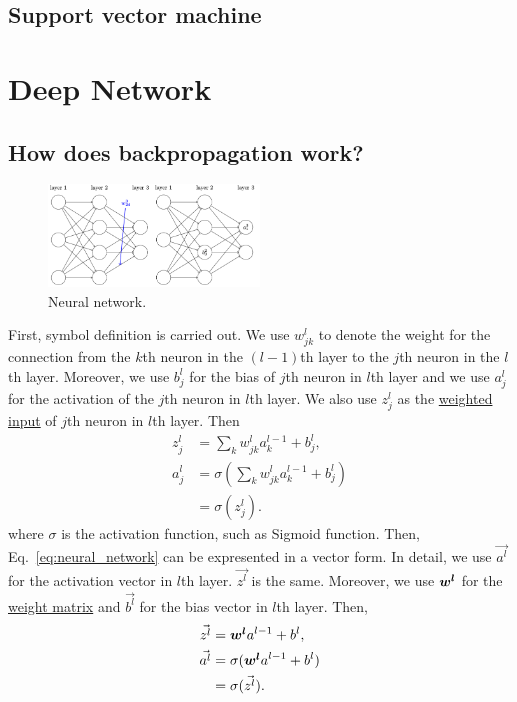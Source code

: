 \documentclass[10pt,onecolumn]{book}
\newcommand{\bm}[1]{\mbox{\boldmath{$#1$}}}
\begin{document}
\section{Support vector machine}


\chapter{Deep Network}
\section{How does backpropagation work?}
\begin{figure}[h]
\centering
\includegraphics[width=0.5\textwidth]{figures/neural_network.png}
\caption{Neural network.}
\end{figure}
First, symbol definition is carried out. We use $w^l_{jk}$ to denote the weight for the connection from the $k$th neuron in the $(l - 1)$th layer to the $j$th neuron in the $l$th layer. Moreover, we use $b^l_j$ for the bias of $j$th neuron in $l$th layer and we use $a^l_j$ for the activation of the $j$th neuron in $l$th layer. We also use $z^l_j$ as the \uline{weighted input}  of $j$th neuron in $l$th layer. Then
\begin{equation}
\begin{split}
z^l_j & = \sum_k w^l_{jk} a^{l - 1} _ k + b^l_j, \\
a^l_j & = \sigma(\sum_k w^l_{jk} a^{l - 1} _ k + b^l_j) \\
	  & = \sigma(z^l_j).
\end{split}
\label{eq:neural_network}
\end{equation}
where $\sigma$ is the activation function, such as Sigmoid function. Then, Eq.~\ref{eq:neural_network} can be expresented in a vector form. In detail, we use $\vec{a^l}$ for the activation vector in $l$th layer. $\vec{z^l}$ is the same. Moreover, we use $\bm{w^l}$ for the \uline{weight matrix} and $\vec{b^l}$ for the bias vector in $l$th layer. Then, 
\begin{equation}
\begin{split}
\vec{z^l} & = \bm{w^l}a^{l - 1} + b^l, \\
\vec{a^l} & = \sigma(\bm{w^l}a^{l - 1} + b^l) \\
		  & = \sigma(\vec{z^l}).
\end{split}
\end{equation}
\end{document}
